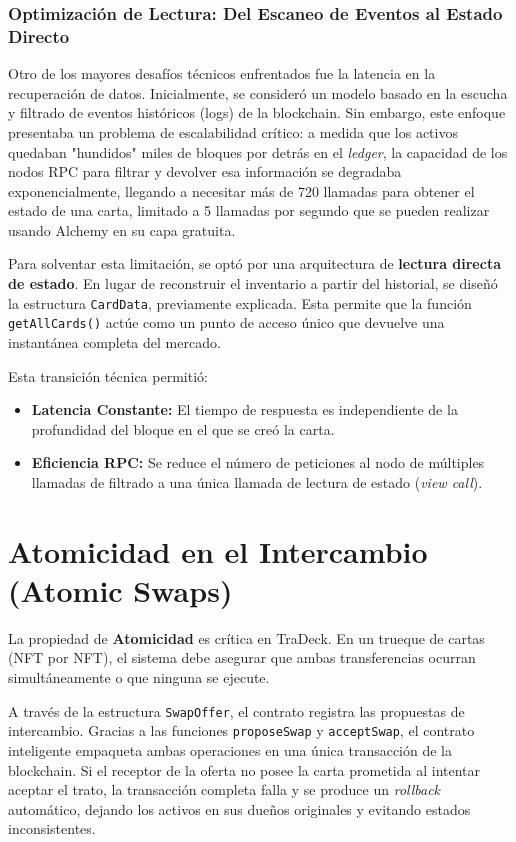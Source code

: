 \subsubsection{Optimización de Lectura: Del Escaneo de Eventos al Estado Directo}
Otro de los mayores desafíos técnicos enfrentados fue la latencia en la recuperación de datos. Inicialmente, se consideró un modelo basado en la escucha y filtrado de eventos históricos (logs) de la blockchain. Sin embargo, este enfoque presentaba un problema de escalabilidad crítico: a medida que los activos quedaban "hundidos" miles de bloques por detrás en el \textit{ledger}, la capacidad de los nodos RPC para filtrar y devolver esa información se degradaba exponencialmente, llegando a necesitar más de 720 llamadas para obtener el estado de una carta, limitado a 5 llamadas por segundo que se pueden realizar usando Alchemy en su capa gratuita.

Para solventar esta limitación, se optó por una arquitectura de \textbf{lectura directa de estado}. En lugar de reconstruir el inventario a partir del historial, se diseñó la estructura \texttt{CardData}, previamente explicada. Esta permite que la función \texttt{getAllCards()} actúe como un punto de acceso único que devuelve una instantánea completa del mercado. 

Esta transición técnica permitió:
\begin{itemize}
	\item \textbf{Latencia Constante:} El tiempo de respuesta es independiente de la profundidad del bloque en el que se creó la carta.
	\item \textbf{Eficiencia RPC:} Se reduce el número de peticiones al nodo de múltiples llamadas de filtrado a una única llamada de lectura de estado (\textit{view call}).
\end{itemize}

\section{Atomicidad en el Intercambio (Atomic Swaps)}
La propiedad de \textbf{Atomicidad} es crítica en TraDeck. En un trueque de cartas 
(NFT por NFT), el sistema debe asegurar que ambas transferencias ocurran simultáneamente 
o que ninguna se ejecute. 

A través de la estructura \texttt{SwapOffer}, el contrato registra las propuestas de 
intercambio. Gracias a las funciones \texttt{proposeSwap} y \texttt{acceptSwap}, el contrato 
inteligente empaqueta ambas operaciones en una única transacción de la blockchain. 
Si el receptor de la oferta no posee la carta prometida al intentar aceptar el 
trato, la transacción completa falla y se produce un \textit{rollback} automático, 
dejando los activos en sus dueños originales y evitando estados inconsistentes.

